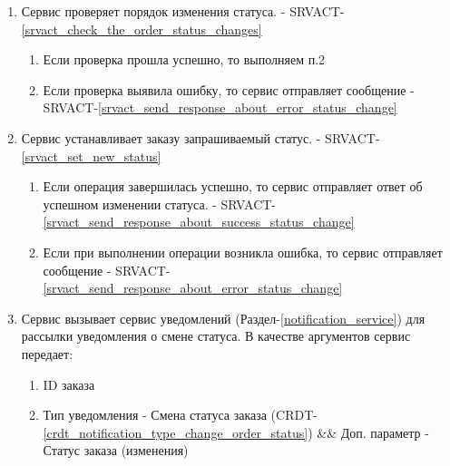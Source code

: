     \begin{alg} \label{alg_order_status_processing} \mbox{}

         \begin{enumerate}

            \item Сервис проверяет порядок изменения статуса. - SRVACT-\ref{srvact_check_the_order_status_changes}

             	\begin{enumerate}

               	\item Если проверка прошла успешно, то выполняем п.2
            
             		\item Если проверка выявила ошибку, то сервис отправляет сообщение - SRVACT-\ref{srvact_send_response_about_error_status_change}

             	\end{enumerate}

            \item Сервис устанавливает заказу запрашиваемый статус. - SRVACT-\ref{srvact_set_new_status}

             	\begin{enumerate}

               	\item Если операция завершилась успешно, то сервис отправляет ответ об успешном изменении статуса. - SRVACT-\ref{srvact_send_response_about_success_status_change}
            
             		\item Если при выполнении операции возникла ошибка, то сервис отправляет сообщение - SRVACT-\ref{srvact_send_response_about_error_status_change}

             	\end{enumerate}

            \item Сервис вызывает сервис уведомлений (Раздел-\ref{notification_service}) для рассылки уведомления о смене статуса. В качестве аргументов сервис передает: 


              \begin{enumerate}

                \item ID заказа
                
                \item Тип уведомления - Смена статуса заказа (CRDT-\ref{crdt_notification_type_change_order_status}) \&\& Доп. параметр - Статус заказа (изменения)

              \end{enumerate}

         \end{enumerate}

         \end{alg}

